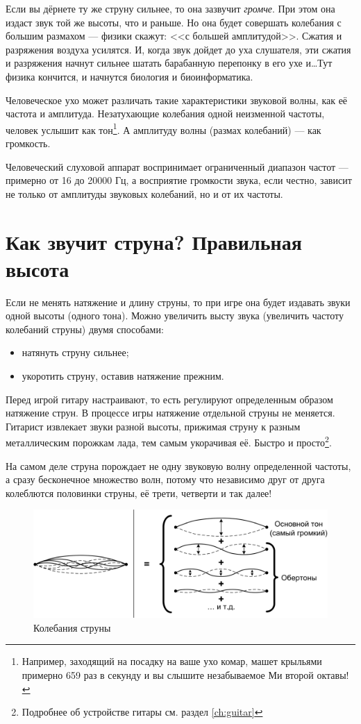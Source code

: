 Если вы дёрнете ту же струну сильнее, то она зазвучит \emph{громче}. При этом она издаст звук той же высоты, что и раньше. Но она будет совершать колебания с большим размахом --- физики скажут: <<с большей амплитудой>>. Сжатия и разряжения воздуха усилятся. И, когда звук дойдет до уха слушателя, эти сжатия и разряжения начнут сильнее шатать барабанную перепонку в его ухе и\ldots Тут физика кончится, и начнутся биология и биоинформатика.

Человеческое ухо может различать такие характеристики звуковой волны, как её частота и амплитуда. Незатухающие колебания одной неизменной частоты, человек услышит как тон\footnote{Например, заходящий на посадку на ваше ухо комар, машет крыльями примерно 659 раз в секунду и вы слышите незабываемое Ми второй октавы!}. А амплитуду волны (размах колебаний) --- как громкость. 

Человеческий слуховой аппарат воспринимает ограниченный диапазон частот --- примерно от 16 до 20000 Гц, а восприятие громкости звука, если честно, зависит не только от амплитуды звуковых колебаний, но и от их частоты. 


\section{Как звучит струна? Правильная высота}
\label{ch:music:tone}

Если не менять натяжение и длину струны, то при игре она будет издавать звуки одной высоты (одного тона). Можно увеличить высту звука (увеличить частоту колебаний струны) двумя способами:
\begin{itemize}
    \item натянуть струну сильнее;
    \item укоротить струну, оставив натяжение прежним.
\end{itemize}

Перед игрой гитару настраивают, то есть регулируют определенным образом натяжение струн. В процессе игры натяжение отдельной струны не меняется. Гитарист извлекает звуки разной высоты, прижимая струну к разным металлическим порожкам лада, тем самым укорачивая её. Быстро и просто\footnote{Подробнее об устройстве гитары см. раздел \ref{ch:guitar}}.

На самом деле струна порождает не одну звуковую волну определенной частоты, а сразу бесконечное множество волн, потому что независимо друг от друга колеблются половинки струны, её трети, четверти и так далее!

\begin{figure}[!ht]
    \centering
    \includegraphics[width=\textwidth]{fig/string-moving} 
    \caption{Колебания струны}\label{fig:music:tone:stringmoving}
\end{figure} 

